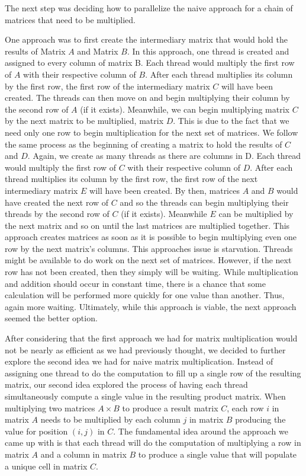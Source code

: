 \documentclass[conference,leqno]{IEEEtran}
\begin{document}
The next step was deciding how to parallelize the naive approach for a chain of matrices that need to be multiplied.

One approach was to first create the intermediary matrix that would hold the results of Matrix $A$ and Matrix $B$. In this approach, one thread is created and assigned to every column of matrix B. Each thread would multiply the first row of $A$ with their respective column of $B$. After each thread multiplies its column by the first row, the first row of the intermediary matrix $C$ will have been created. The threads can then move on and begin multiplying their column by the second row of $A$ (if it exists). Meanwhile, we can begin multiplying matrix $C$ by the next matrix to be multiplied, matrix $D$. This is due to the fact that we need only one row to begin multiplication for the next set of matrices. We follow the same process as the beginning of creating a matrix to hold the results of $C$ and $D$. Again, we create as many threads as there are columns in D. Each thread would multiply the first row of $C$ with their respective column of $D$. After each thread multiplies its column by the first row, the first row of the next intermediary matrix $E$ will have been created. By then, matrices $A$ and $B$ would have created the next row of $C$ and so the threads can begin multiplying their threads by the second row of $C$ (if it exists). Meanwhile $E$ can be multiplied by the next matrix and so on until the last matrices are multiplied together. This approach creates matrices as soon as it is possible to begin multiplying even one row by the next matrix’s columns. This approaches issue is starvation. Threads might be available to do work on the next set of matrices. However, if the next row has not been created, then they simply will be waiting. While multiplication and addition should occur in constant time, there is a chance that some calculation will be performed more quickly for one value than another. Thus, again more waiting. Ultimately, while this approach is viable, the next approach seemed the better option.

After considering that the first approach we had for matrix multiplication would not be nearly as efficient as we had previously thought, we decided to further explore the second idea we had for naive matrix multiplication. Instead of assigning one thread to do the computation to fill up a single row of the resulting matrix, our second idea explored the process of having each thread simultaneously compute a single value in the resulting product matrix. When multiplying two matrices $A \times B$ to produce a result matrix $C$, each row $i$ in matrix $A$ needs to be multiplied by each column $j$ in matrix $B$ producing the value for position $(i, j)$ in $C$. The fundamental idea around the approach we came up with is that each thread will do the computation of multiplying a row in matrix $A$ and a column in matrix $B$ to produce a single value that will populate a unique cell in matrix $C$.
\end{document}
